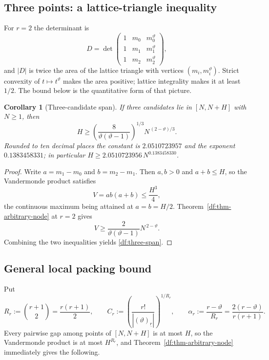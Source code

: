 \documentclass[11pt,oneside]{article}
\newtheorem{corollary}[theorem]{Corollary}
\theoremstyle{definition}
\theoremstyle{remark}
\newcommand{\thetaq}{\vartheta}
\newcommand{\fall}[2]{\left(#1\right)_{\!\underline{#2}}}
\begin{document}
\subsection{Three points: a lattice-triangle inequality}

For $r=2$ the determinant is
\[
 D=\det\begin{pmatrix}
 1&m_0&m_0^{\thetaq}\\
 1&m_1&m_1^{\thetaq}\\
 1&m_2&m_2^{\thetaq}
 \end{pmatrix},
\]
and $|D|$ is twice the area of the lattice triangle with vertices $(m_i,m_i^{\thetaq})$.
Strict convexity of $t\mapsto t^{\thetaq}$ makes the area positive; lattice integrality makes
it at least $1/2$.  The bound below is the quantitative form of that picture.

\begin{corollary}[Three-candidate span]
\label{df:cor-three-span}
If three candidates lie in $[N,N+H]$ with $N\ge1$, then
\begin{equation}
 H\ge\left(\frac{8}{\thetaq(\thetaq-1)}\right)^{1/3}N^{\,(2-\thetaq)/3}.
\label{df:three-span}
\end{equation}
Rounded to ten decimal places the constant is $2.0510723957$ and the exponent
$0.1383458331$; in particular $H\ge2.0510723956\,N^{0.1383458330}$.
\end{corollary}

\begin{proof}
Write $a=m_1-m_0$ and $b=m_2-m_1$.  Then $a,b>0$ and $a+b\le H$, so the Vandermonde product
satisfies
\[
 V=ab(a+b)\le\frac{H^{3}}{4},
\]
the continuous maximum being attained at $a=b=H/2$.  Theorem~\ref{df:thm-arbitrary-node} at
$r=2$ gives
\[
 V\ge\frac{2}{\thetaq(\thetaq-1)}N^{\,2-\thetaq}.
\]
Combining the two inequalities yields \eqref{df:three-span}.
\end{proof}

\subsection{General local packing bound}

Put
\[
 R_r:=\binom{r+1}{2}=\frac{r(r+1)}{2},
 \qquad
 C_r:=\left(\frac{r!}{|\fall{\thetaq}{r}|}\right)^{1/R_r},
 \qquad
 \alpha_r:=\frac{r-\thetaq}{R_r}=\frac{2(r-\thetaq)}{r(r+1)}.
\]
Every pairwise gap among points of $[N,N+H]$ is at most $H$, so the Vandermonde product is at
most $H^{R_r}$, and Theorem~\ref{df:thm-arbitrary-node} immediately gives the following.
\end{document}
